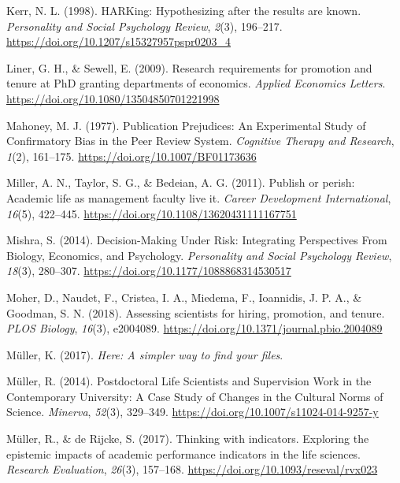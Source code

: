 \documentclass[
  ,man,mask,floatsintext]{apa6}
\newlength{\cslhangindent}
\newlength{\cslentryspacingunit} %
\newenvironment{CSLReferences}[2] %
 {%
  \setlength{\parindent}{0pt}
  \ifodd #1
  \let\oldpar\par
  \def\par{\hangindent=\cslhangindent\oldpar}
  \fi
  \setlength{\parskip}{#2\cslentryspacingunit}
 }%
 {}
\begin{document}
\begin{CSLReferences}{1}{0}
\leavevmode{}%
Kerr, N. L. (1998). {HARKing}: {Hypothesizing} after the results are known. \emph{Personality and Social Psychology Review}, \emph{2}(3), 196--217. \url{https://doi.org/10.1207/s15327957pspr0203_4}

\leavevmode{}%
Liner, G. H., \& Sewell, E. (2009). Research requirements for promotion and tenure at {PhD} granting departments of economics. \emph{Applied Economics Letters}. \url{https://doi.org/10.1080/13504850701221998}

\leavevmode{}%
Mahoney, M. J. (1977). Publication {Prejudices}: {An Experimental Study} of {Confirmatory Bias} in the {Peer Review System}. \emph{Cognitive Therapy and Research}, \emph{1}(2), 161--175. \url{https://doi.org/10.1007/BF01173636}

\leavevmode{}%
Miller, A. N., Taylor, S. G., \& Bedeian, A. G. (2011). Publish or perish: Academic life as management faculty live it. \emph{Career Development International}, \emph{16}(5), 422--445. \url{https://doi.org/10.1108/13620431111167751}

\leavevmode{}%
Mishra, S. (2014). Decision-{Making Under Risk}: {Integrating Perspectives From Biology}, {Economics}, and {Psychology}. \emph{Personality and Social Psychology Review}, \emph{18}(3), 280--307. \url{https://doi.org/10.1177/1088868314530517}

\leavevmode{}%
Moher, D., Naudet, F., Cristea, I. A., Miedema, F., Ioannidis, J. P. A., \& Goodman, S. N. (2018). Assessing scientists for hiring, promotion, and tenure. \emph{PLOS Biology}, \emph{16}(3), e2004089. \url{https://doi.org/10.1371/journal.pbio.2004089}

\leavevmode{}%
Müller, K. (2017). \emph{Here: {A} simpler way to find your files}.

\leavevmode{}%
Müller, R. (2014). Postdoctoral {Life Scientists} and {Supervision Work} in the {Contemporary University}: {A Case Study} of {Changes} in the {Cultural Norms} of {Science}. \emph{Minerva}, \emph{52}(3), 329--349. \url{https://doi.org/10.1007/s11024-014-9257-y}

\leavevmode{}%
Müller, R., \& de Rijcke, S. (2017). Thinking with indicators. {Exploring} the epistemic impacts of academic performance indicators in the life sciences. \emph{Research Evaluation}, \emph{26}(3), 157--168. \url{https://doi.org/10.1093/reseval/rvx023}


\end{CSLReferences}
\end{document}
